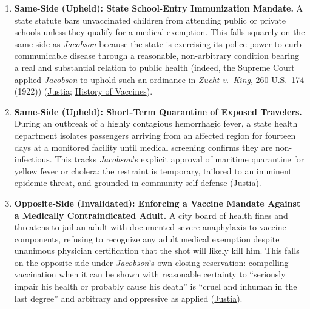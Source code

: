 \documentclass[12pt]{article}
\begin{document}
\begin{enumerate}
\item \textbf{Same-Side (Upheld): State School-Entry Immunization Mandate.} A state statute bars unvaccinated children from attending public or private schools unless they qualify for a medical exemption. This falls squarely on the same side as \textit{Jacobson} because the state is exercising its police power to curb communicable disease through a reasonable, non-arbitrary condition bearing a real and substantial relation to public health (indeed, the Supreme Court applied \textit{Jacobson} to uphold such an ordinance in \textit{Zucht v.\ King}, 260 U.S.\ 174 (1922)) (\href{https://supreme.justia.com/cases/federal/us/197/11/}{Justia}; \href{https://historyofvaccines.org/blog/faith-law-and-needle-history-religious-exemptions-vaccination-united-states/}{History of Vaccines}).

\item \textbf{Same-Side (Upheld): Short-Term Quarantine of Exposed Travelers.} During an outbreak of a highly contagious hemorrhagic fever, a state health department isolates passengers arriving from an affected region for fourteen days at a monitored facility until medical screening confirms they are non-infectious. This tracks \textit{Jacobson}'s explicit approval of maritime quarantine for yellow fever or cholera: the restraint is temporary, tailored to an imminent epidemic threat, and grounded in community self-defense (\href{https://supreme.justia.com/cases/federal/us/197/11/}{Justia}).

\item \textbf{Opposite-Side (Invalidated): Enforcing a Vaccine Mandate Against a Medically Contraindicated Adult.} A city board of health fines and threatens to jail an adult with documented severe anaphylaxis to vaccine components, refusing to recognize any adult medical exemption despite unanimous physician certification that the shot will likely kill him. This falls on the opposite side under \textit{Jacobson}'s own closing reservation: compelling vaccination when it can be shown with reasonable certainty to ``seriously impair his health or probably cause his death'' is ``cruel and inhuman in the last degree'' and arbitrary and oppressive as applied (\href{https://supreme.justia.com/cases/federal/us/197/11/}{Justia}).


\end{enumerate}
\end{document}
